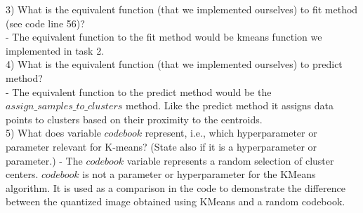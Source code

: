     3) What is the equivalent function (that we implemented ourselves) to fit method (see code line 56)? \\
    - The equivalent function to the fit method would be kmeans function we implemented in task 2. \\

    4) What is the equivalent function (that we implemented ourselves) to predict method? \\
    - The equivalent function to the predict method would be the $assign\_samples\_to\_clusters$ method. Like the predict method it assigns data points to clusters based on their proximity to the centroids.\\

    5) What does variable $codebook$ represent, i.e., which hyperparameter or parameter relevant for K-means? (State also if it is a hyperparameter or parameter.)
    - The $codebook$ variable represents a random selection of cluster centers. $codebook$ is not a parameter or hyperparameter for the KMeans algorithm. It is used as a comparison in the code to demonstrate the difference between the quantized image obtained using KMeans and a random codebook.

    
    
    




